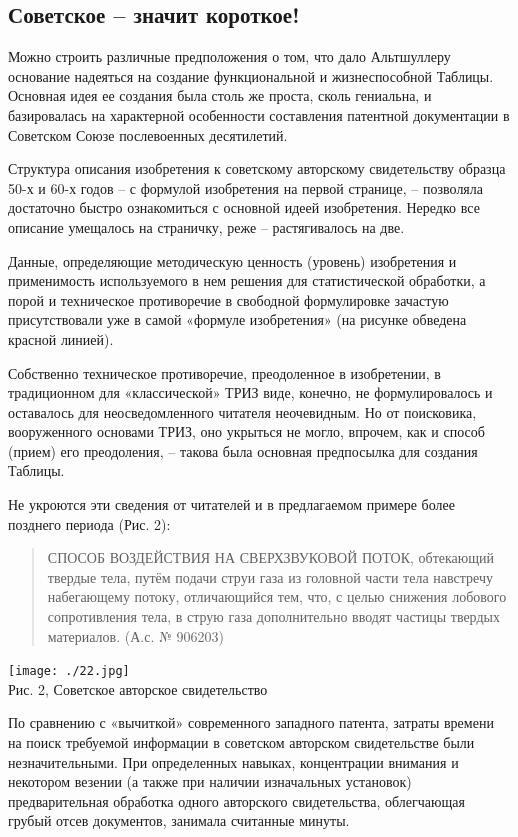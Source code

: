 \documentclass[11pt,a4paper]{article}
\begin{document}
\subsection*{Советское -- значит короткое!}

Можно строить различные предположения о том, что дало Альтшуллеру основание
надеяться на создание функциональной и жизнеспособной Таблицы. Основная идея
ее создания была столь же проста, сколь гениальна, и базировалась на
характерной особенности составления патентной документации в Советском Союзе
послевоенных десятилетий.

Структура описания изобретения к советскому авторскому свидетельству образца
50-х и 60-х годов -- с формулой изобретения на первой странице, -- позволяла
достаточно быстро ознакомиться с основной идеей изобретения. Нередко все
описание умещалось на страничку, реже -- растягивалось на две.

Данные, определяющие методическую ценность (уровень) изобретения и
применимость используемого в нем решения для статистической обработки, а порой
и техническое противоречие в свободной формулировке зачастую присутствовали
уже в самой «формуле изобретения» (на рисунке обведена красной линией).

Собственно техническое противоречие, преодоленное в изобретении, в
традиционном для «классической» ТРИЗ виде, конечно, не формулировалось и
оставалось для неосведомленного читателя неочевидным. Но от поисковика,
вооруженного основами ТРИЗ, оно укрыться не могло, впрочем, как и способ
(прием) его преодоления, -- такова была основная предпосылка для создания
Таблицы.

Не укроются эти сведения от читателей и в предлагаемом примере более позднего
периода (Рис. 2):
\begin{quote}
  СПОСОБ ВОЗДЕЙСТВИЯ НА СВЕРХЗВУКОВОЙ ПОТОК, обтекающий твердые тела, путём
  подачи струи газа из головной части тела навстречу набегающему потоку,
  отличающийся тем, что, с целью снижения лобового сопротивления тела, в струю
  газа дополнительно вводят частицы твердых материалов. (А.с. № 906203)
\end{quote}
\begin{center}
  \texttt{[image: ./22.jpg]} \\
  Рис. 2, Советское авторское свидетельство
\end{center}

По сравнению с «вычиткой» современного западного патента, затраты времени на
поиск требуемой информации в советском авторском свидетельстве были
незначительными. При определенных навыках, концентрации внимания и некотором
везении (а также при наличии изначальных установок) предварительная обработка
одного авторского свидетельства, облегчающая грубый отсев документов, занимала
считанные минуты.
\end{document}
